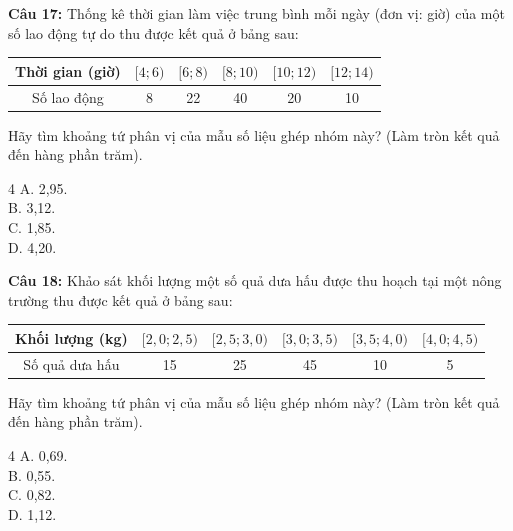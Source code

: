 \documentclass[12pt]{article}
\begin{document}
	\noindent \textbf{Câu 17:} Thống kê thời gian làm việc trung bình mỗi ngày (đơn vị: giờ) của một số lao động tự do thu được kết quả ở bảng sau:
	\begin{center}
		\renewcommand{\arraystretch}{1.3}
		\begin{tabular}{|c|c|c|c|c|c|}
			\hline
			Thời gian (giờ) & $[4; 6)$ & $[6; 8)$ & $[8; 10)$ & $[10; 12)$ & $[12; 14)$ \\
			\hline
			Số lao động & 8 & 22 & 40 & 20 & 10 \\
			\hline
		\end{tabular}
	\end{center}
	Hãy tìm khoảng tứ phân vị của mẫu số liệu ghép nhóm này? (Làm tròn kết quả đến hàng phần trăm).
	\begin{multicols}{4}
		A. 2,95. \\
		B. 3,12. \\
		C. 1,85. \\
		D. 4,20.
	\end{multicols}
	
	\vspace{4mm}
	
	\noindent \textbf{Câu 18:} Khảo sát khối lượng một số quả dưa hấu được thu hoạch tại một nông trường thu được kết quả ở bảng sau:
	\begin{center}
		\renewcommand{\arraystretch}{1.3}
		\begin{tabular}{|c|c|c|c|c|c|}
			\hline
			Khối lượng (kg) & $[2,0; 2,5)$ & $[2,5; 3,0)$ & $[3,0; 3,5)$ & $[3,5; 4,0)$ & $[4,0; 4,5)$ \\
			\hline
			Số quả dưa hấu & 15 & 25 & 45 & 10 & 5 \\
			\hline
		\end{tabular}
	\end{center}
	Hãy tìm khoảng tứ phân vị của mẫu số liệu ghép nhóm này? (Làm tròn kết quả đến hàng phần trăm).
	\begin{multicols}{4}
		A. 0,69. \\
		B. 0,55. \\
		C. 0,82. \\
		D. 1,12.
	\end{multicols}
	
	\vspace{4mm}
	
\end{document}
